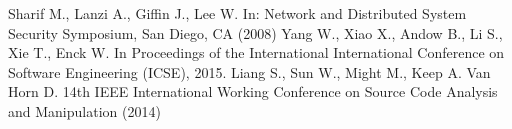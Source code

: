 \begin{thebibliography}{4}
        Sharif M., Lanzi A., Giffin J., Lee W.
        \newblock In: Network and Distributed System Security Symposium, San Diego, CA (2008)
        Yang W., Xiao X., Andow B., Li S., Xie T., Enck W.
        \newblock In Proceedings of the International International Conference on Software Engineering (ICSE), 2015.
        Liang S., Sun W., Might M., Keep A. Van Horn D.
        \newblock 14th IEEE International Working Conference on Source Code Analysis and Manipulation (2014)
\end{thebibliography}

